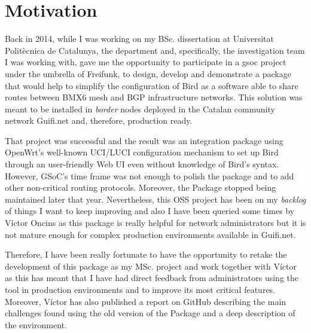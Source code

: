 
\section{Motivation}
\label{sec:motivation}
Back in 2014, while I was working on my BSc. dissertation at Universitat Politècnica de Catalunya, the department and, specifically, the investigation team I was working with, gave me the opportunity to participate in a \Gls{gsoc} project under the umbrella of Freifunk, to design, develop and demonstrate a package that would help to simplify the configuration of Bird as a software able to share routes between BMX6 mesh and BGP infrastructure networks. This solution was meant to be installed in \textit{border} nodes deployed in the Catalan community network Guifi.net and, therefore, production ready.

That project was successful and the result was an integration package using OpenWrt's well-known UCI/LUCI configuration mechanism to set up Bird through an user-friendly Web UI even without knowledge of Bird's syntax. However, GSoC's time frame was not enough to polish the package and to add other non-critical routing protocols. Moreover, the Package stopped being maintained later that year. Nevertheless, this OSS project has been on my \textit{backlog} of things I want to keep improving and also I have been queried some times by Víctor Oncins as this package is really helpful for network administrators but it is not mature enough for complex production environments available in Guifi.net.

Therefore, I have been really fortunate to have the opportunity to retake the development of this package as my MSc. project  and work together with Víctor as this has meant that I have had direct feedback from administrators using the tool in production environments and to improve its most critical features. Moreover, Víctor has also published a report on GitHub \cite{bgpbmx6} describing the main challenges found using the old version of the Package and a deep description of the environment.


